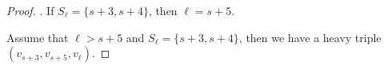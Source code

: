 \begin{proof}

. If $S_{\ell}=\{ s+3, s+4\}$, then $\ell=s+5$. 

Assume that $\ell>s+5$ and $S_{\ell}=\{ s+3, s+4\}$, then we have a heavy triple $(v_{s+3},v_{s+5},v_{\ell})$.
\end{proof}

